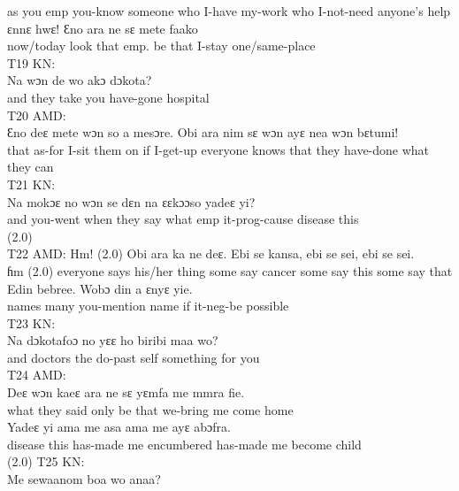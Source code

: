 \documentclass[output=paper,colorlinks,citecolor=brown]{langscibook}
\begin{document}
            as you emp you-know someone who I-have my-work who I-not-need anyone’s help\\
    \ex
    \gll    ɛnnɛ hwɛ! Ɛno ara ne sɛ mete faako \\
            now/today look that emp. be that I-stay one/same-place\\
    \z
\ex%
    T19 KN:\\
    \gll    Na wɔn de wo akɔ dɔkota?\\
            and they take you have-gone hospital\\
\ex%
    T20 AMD:\\
    \gll    Ɛno deɛ mete wɔn so a mesɔre. Obi ara nim sɛ wɔn ayɛ nea wɔn bɛtumi!\\
            that as-for I-sit them on if I-get-up everyone knows that they have-done what they can\\
\ex%
    T21 KN:\\
    \gll    Na mokɔɛ no wɔn se dɛn na ɛɛkɔɔso yadeɛ yi?\\
            and you-went when they say what emp it-prog-cause disease this\\
            (2.0) \\
\ex%
    T22 AMD:
    \ea
    \gll    Hm! (2.0) Obi ara ka ne deɛ. Ebi se kansa, ebi se sei, ebi se sei. \\
            ɦm (2.0) everyone says his/her thing some say cancer some say this some say that \\
    \ex
    \gll    Edin bebree. Wobɔ din a ɛnyɛ yie.\\
            names many you-mention name if it-neg-be possible \\
    \z
\ex%
    T23 KN:\\
    \gll    Na dɔkotafoɔ no yɛɛ ho biribi maa wo?\\
            and doctors the do-past self something for you\\
\ex%
    T24 AMD:\\
    \ea
    \gll    Deɛ wɔn kaeɛ ara ne sɛ yɛmfa me mmra fie. \\
            what they said only be that we-bring me come home\\
    \ex     
    \gll    Yadeɛ yi ama me asa ama me ayɛ abɔfra.\\
            disease this has-made me encumbered has-made me become child\\
            (2.0)
    \z
\ex%
    T25 KN:\\
    \gll    Me sewaanom boa wo anaa? \\
\end{document}
